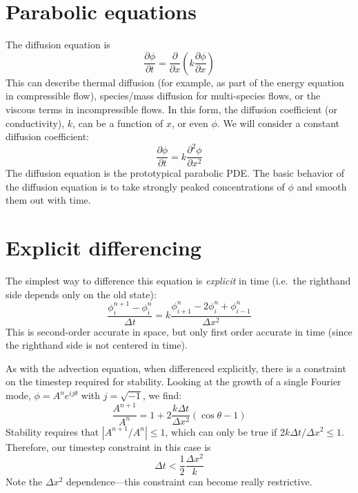 \label{ch:diffusion}

\begin{quote}
\end{quote}

\section{Parabolic equations}

The diffusion equation is
\begin{equation}
\frac{\partial \phi}{\partial t} = 
  \frac{\partial }{\partial x} 
  \left ( k \frac{\partial \phi}{\partial x} \right )
\end{equation}
This can describe thermal diffusion (for example, as part of the energy
equation in compressible flow), species/mass diffusion for multi-species
flows, or the viscous terms in incompressible flows.  In this form,
the diffusion coefficient (or conductivity), $k$, can be a function
of $x$, or even $\phi$.  We will consider a constant diffusion coefficient:
\begin{equation}
\frac{\partial \phi}{\partial t} = k \frac{\partial^2 \phi}{\partial x^2}
\end{equation}
The diffusion equation is the prototypical parabolic PDE.
The basic behavior of the diffusion equation is to take strongly peaked
concentrations of $\phi$ and smooth them out with time.



\section{Explicit differencing}

The simplest way to difference this equation is {\em explicit} in time
(i.e.\ the righthand side depends only on the old state):
\begin{equation}
\frac{\phi_i^{n+1} - \phi_i^n}{\Delta t} = 
  k \frac{\phi_{i+1}^n - 2\phi_i^n + \phi_{i-1}^n}{\Delta x^2}
\end{equation}
This is second-order accurate in space, but only first order accurate in
time (since the righthand side is not centered in time).

As with the advection equation, when differenced explicitly, there is
a constraint on the timestep required for stability.  Looking at the
growth of a single Fourier mode, $\phi = A^n e^{ij\theta}$ with $j =
\sqrt{-1}$, we find:
\begin{equation}
\frac{A^{n+1}}{A^n} = 1 + 2 \frac{k \Delta t}{\Delta x^2} ( \cos\theta - 1)
\end{equation}
Stability requires that $|A^{n+1}/A^n| \le 1$, which can only be true
if $2k\Delta t/\Delta x^2 \le 1$.  Therefore, our timestep
constraint in this case is
\begin{equation}
\label{eq:diff:dt}
\Delta t < \frac{1}{2} \frac{\Delta x^2}{k}
\end{equation}
Note the $\Delta x^2$ dependence---this constraint can become really
restrictive.

